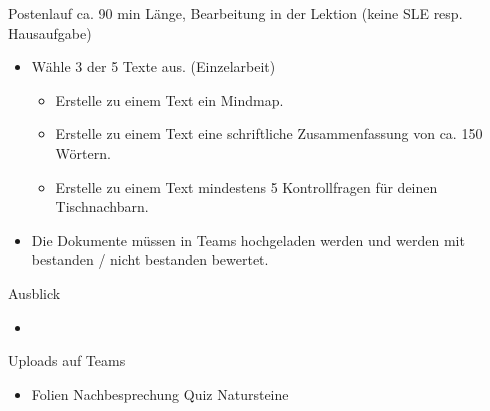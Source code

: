 \begin{frame}{Postenlauf}
ca. 90 min Länge, Bearbeitung in der Lektion (keine SLE resp. Hausaufgabe)
\begin{itemize}
    \item [\textbullet] Wähle 3 der 5 Texte aus. (Einzelarbeit)
    \begin{itemize}
        \item [\textbullet] Erstelle zu einem Text ein Mindmap. 
        \item [\textbullet] Erstelle zu einem Text eine schriftliche Zusammenfassung von ca. 150 Wörtern.
        \item [\textbullet] Erstelle zu einem Text mindestens 5 Kontrollfragen für deinen Tischnachbarn.
    \end{itemize}
    \item [\textbullet] Die Dokumente müssen in Teams hochgeladen werden und werden mit bestanden / nicht bestanden bewertet.
\end{itemize}
\end{frame}

    \begin{frame}{Ausblick}
    	\begin{itemize}
    		\item {}
    	\end{itemize}
    \end{frame}

    \begin{frame}{Uploads auf Teams}
        \begin{itemize}
            \item[\textbullet] Folien Nachbesprechung Quiz Natursteine
        \end{itemize}
        
    \end{frame}

        
    \folieFragen


    